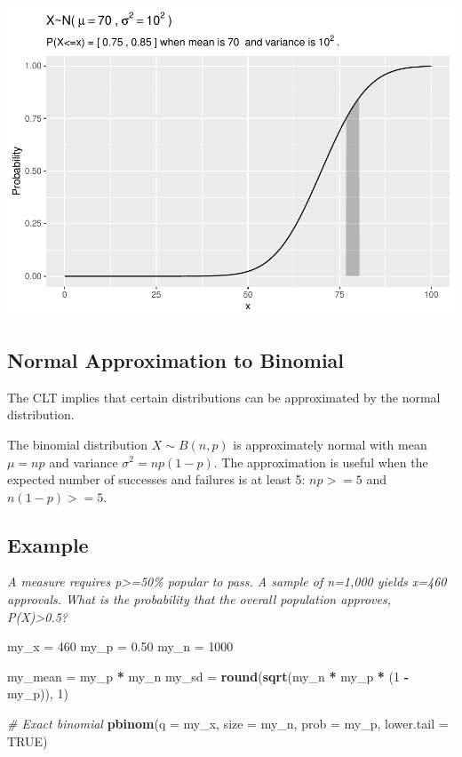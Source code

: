 \documentclass[
]{book}
\newenvironment{Shaded}{\begin{snugshade}}{\end{snugshade}}
\newcommand{\CommentTok}[1]{\textcolor[rgb]{0.56,0.35,0.01}{\textit{#1}}}
\newcommand{\DataTypeTok}[1]{\textcolor[rgb]{0.13,0.29,0.53}{#1}}
\newcommand{\DecValTok}[1]{\textcolor[rgb]{0.00,0.00,0.81}{#1}}
\newcommand{\FloatTok}[1]{\textcolor[rgb]{0.00,0.00,0.81}{#1}}
\newcommand{\KeywordTok}[1]{\textcolor[rgb]{0.13,0.29,0.53}{\textbf{#1}}}
\newcommand{\NormalTok}[1]{#1}
\newcommand{\OperatorTok}[1]{\textcolor[rgb]{0.81,0.36,0.00}{\textbf{#1}}}
\newcommand{\OtherTok}[1]{\textcolor[rgb]{0.56,0.35,0.01}{#1}}
\newcommand{\StringTok}[1]{\textcolor[rgb]{0.31,0.60,0.02}{#1}}
\begin{document}
\includegraphics{data-sci_files/figure-latex/unnamed-chunk-16-1.pdf}

\hypertarget{normal-approximation-to-binomial}{%
\subsection{Normal Approximation to Binomial}\label{normal-approximation-to-binomial}}

The CLT implies that certain distributions can be approximated by the normal distribution.

The binomial distribution \(X \sim B(n,p)\) is approximately normal with mean \(\mu = n p\) and variance \(\sigma^2=np(1-p)\). The approximation is useful when the expected number of successes and failures is at least 5: \(np>=5\) and \(n(1-p)>=5\).

\hypertarget{example-4}{%
\subsection{Example}\label{example-4}}

\emph{A measure requires p\textgreater=50\% popular to pass. A sample of n=1,000 yields x=460 approvals. What is the probability that the overall population approves, P(X)\textgreater0.5?}

\begin{Shaded}
\begin{Highlighting}[]
\NormalTok{my_x =}\StringTok{ }\DecValTok{460}
\NormalTok{my_p =}\StringTok{ }\FloatTok{0.50}
\NormalTok{my_n =}\StringTok{ }\DecValTok{1000}

\NormalTok{my_mean =}\StringTok{ }\NormalTok{my_p }\OperatorTok{*}\StringTok{ }\NormalTok{my_n}
\NormalTok{my_sd =}\StringTok{ }\KeywordTok{round}\NormalTok{(}\KeywordTok{sqrt}\NormalTok{(my_n }\OperatorTok{*}\StringTok{ }\NormalTok{my_p }\OperatorTok{*}\StringTok{ }\NormalTok{(}\DecValTok{1} \OperatorTok{-}\StringTok{ }\NormalTok{my_p)), }\DecValTok{1}\NormalTok{)}

\CommentTok{# Exact binomial}
\KeywordTok{pbinom}\NormalTok{(}\DataTypeTok{q =}\NormalTok{ my_x, }\DataTypeTok{size =}\NormalTok{ my_n, }\DataTypeTok{prob =}\NormalTok{ my_p, }\DataTypeTok{lower.tail =} \OtherTok{TRUE}\NormalTok{)}
\end{Highlighting}
\end{Shaded}
\end{document}
